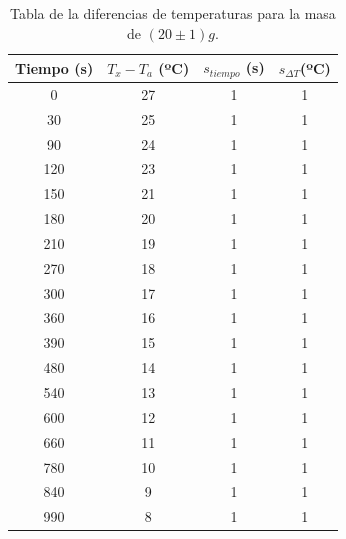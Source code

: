 \documentclass[a4paper]{article}
\begin{document}
\begin{table}[H]
  \centering
    \begin{tabular}{|c|c|c|c|} \hline
    Tiempo (s) & $T_x - T_a$ (ºC) & $s_{tiempo }$ (s) &  $s_{ \Delta T} $(ºC) \\ \hline
    0     & 27    & 1     & 1 \\ \hline
    30    & 25    & 1     & 1 \\ \hline
    90    & 24    & 1     & 1 \\ \hline
    120   & 23    & 1     & 1 \\ \hline
    150   & 21    & 1     & 1 \\ \hline
    180   & 20    & 1     & 1 \\ \hline
    210   & 19    & 1     & 1 \\ \hline
    270   & 18    & 1     & 1 \\ \hline
    300   & 17    & 1     & 1 \\ \hline
    360   & 16    & 1     & 1 \\ \hline
    390   & 15    & 1     & 1 \\ \hline
    480   & 14    & 1     & 1 \\ \hline
    540   & 13    & 1     & 1 \\ \hline
    600   & 12    & 1     & 1 \\ \hline
    660   & 11    & 1     & 1 \\ \hline
    780   & 10    & 1     & 1 \\ \hline
    840   & 9     & 1     & 1 \\ \hline
    990   & 8     & 1     & 1 \\ \hline
    \end{tabular}%
  \caption{Tabla de la diferencias de temperaturas para la masa de $(20\pm 1)g$.}
\end{table}%
\end{document}
